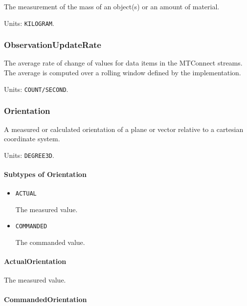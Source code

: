 The measurement of the mass of an object(s) or an amount of material.


Units: \texttt{KILOGRAM}.

\subsubsection{ObservationUpdateRate}
\label{sec:ObservationUpdateRate}



The average rate of change of values for data items in the MTConnect streams. The average is computed over a rolling window defined by the implementation.


Units: \texttt{COUNT/SECOND}.

\subsubsection{Orientation}
\label{sec:Orientation}



A measured or calculated orientation of a plane or vector relative to a cartesian coordinate system.


Units: \texttt{DEGREE\textunderscore 3D}.

\paragraph{Subtypes of Orientation}\mbox{}
\label{sec:Subtypes of Orientation}

\begin{itemize}

\item \texttt{ACTUAL}


The measured value.

\item \texttt{COMMANDED}


The commanded value.


\end{itemize}

\paragraph{ActualOrientation}\mbox{}
\label{sec:ActualOrientation}


The measured value.


\paragraph{CommandedOrientation}\mbox{}
\label{sec:CommandedOrientation}



